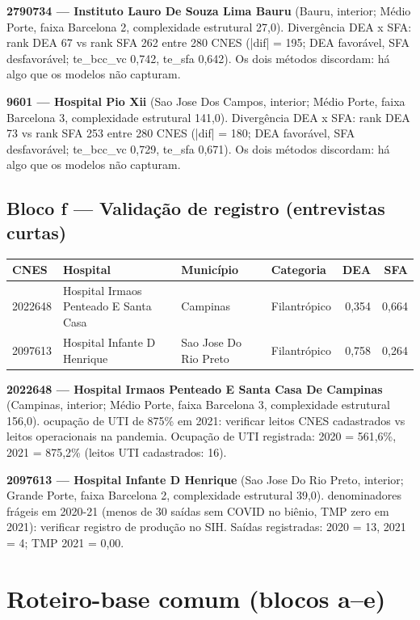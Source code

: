 \documentclass[12pt,a4paper]{article}
\begin{document}
\noindent\textbf{2790734 --- Instituto Lauro De Souza Lima Bauru} (Bauru, interior; Médio Porte, faixa Barcelona 2, complexidade estrutural 27,0). Divergência DEA x SFA: rank DEA 67 vs rank SFA 262 entre 280 CNES (|dif| = 195; DEA favorável, SFA desfavorável; te\_bcc\_vc 0,742, te\_sfa 0,642). Os dois métodos discordam: há algo que os modelos não capturam.\par\medskip
\noindent\textbf{9601 --- Hospital Pio Xii} (Sao Jose Dos Campos, interior; Médio Porte, faixa Barcelona 3, complexidade estrutural 141,0). Divergência DEA x SFA: rank DEA 73 vs rank SFA 253 entre 280 CNES (|dif| = 180; DEA favorável, SFA desfavorável; te\_bcc\_vc 0,729, te\_sfa 0,671). Os dois métodos discordam: há algo que os modelos não capturam.\par\medskip

\subsection{Bloco f --- Validação de registro (entrevistas curtas)}
\begin{center}\small
\begin{tabular}{llllrr}
\toprule
CNES & Hospital & Município & Categoria & DEA & SFA \\
\midrule
2022648 & Hospital Irmaos Penteado E Santa Casa  & Campinas & Filantrópico & 0,354 & 0,664 \\
2097613 & Hospital Infante D Henrique & Sao Jose Do Rio Preto & Filantrópico & 0,758 & 0,264 \\
\bottomrule
\end{tabular}
\end{center}
\noindent\textbf{2022648 --- Hospital Irmaos Penteado E Santa Casa De Campinas} (Campinas, interior; Médio Porte, faixa Barcelona 3, complexidade estrutural 156,0). ocupação de UTI de 875\% em 2021: verificar leitos CNES cadastrados vs leitos operacionais na pandemia. Ocupação de UTI registrada: 2020 = 561,6\%, 2021 = 875,2\% (leitos UTI cadastrados: 16).\par\medskip
\noindent\textbf{2097613 --- Hospital Infante D Henrique} (Sao Jose Do Rio Preto, interior; Grande Porte, faixa Barcelona 2, complexidade estrutural 39,0). denominadores frágeis em 2020-21 (menos de 30 saídas sem COVID no biênio, TMP zero em 2021): verificar registro de produção no SIH. Saídas registradas: 2020 = 13, 2021 = 4; TMP 2021 = 0,00.\par\medskip

\section{Roteiro-base comum (blocos a--e)}
\label{sec:base}
\end{document}
